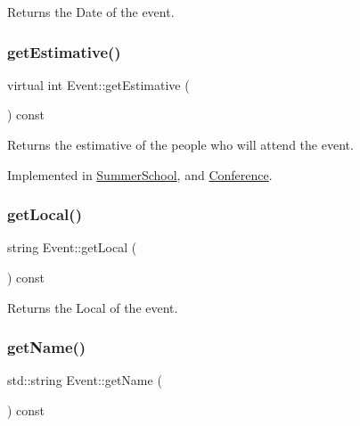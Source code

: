 Returns the Date of the event. 

\mbox{\label{classEvent_a18ac55c239f648fc0ad5687c426f2a8f}} 
\subsubsection{\texorpdfstring{get\+Estimative()}{getEstimative()}}
{\footnotesize\ttfamily virtual int Event\+::get\+Estimative (\begin{DoxyParamCaption}{ }\end{DoxyParamCaption}) const\hspace{0.3cm}{\ttfamily [pure virtual]}}



Returns the estimative of the people who will attend the event. 



Implemented in \hyperlink{classSummerSchool_a019b9e38108b7dd31cd93cab285d0d00}{Summer\+School}, and \hyperlink{classConference_a9d96f80eb37bdbf57bf318c8bd484e88}{Conference}.

\mbox{\label{classEvent_aa2b3aee8416f68b890083a09eecfea8b}} 
\subsubsection{\texorpdfstring{get\+Local()}{getLocal()}}
{\footnotesize\ttfamily string Event\+::get\+Local (\begin{DoxyParamCaption}{ }\end{DoxyParamCaption}) const}



Returns the Local of the event. 

\mbox{\label{classEvent_a36453ab5a21b660a61f2a0369e2689e8}} 
\subsubsection{\texorpdfstring{get\+Name()}{getName()}}
{\footnotesize\ttfamily std\+::string Event\+::get\+Name (\begin{DoxyParamCaption}{ }\end{DoxyParamCaption}) const\hspace{0.3cm}{\ttfamily [inline]}}



